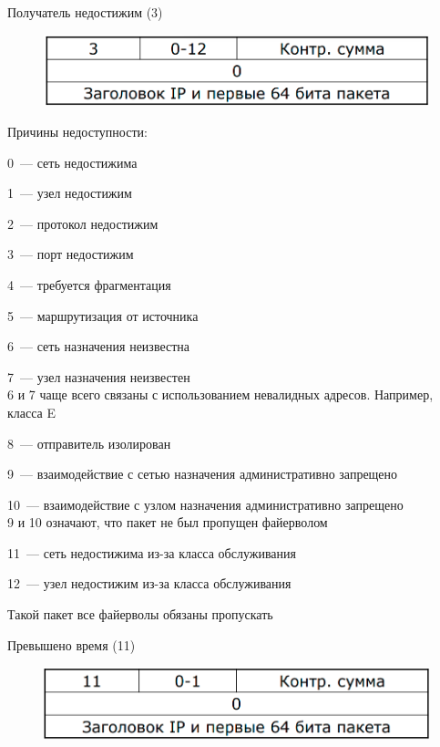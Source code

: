 
\begin{MyItemize}
    \item Получатель недостижим (3)\\
    \begin{figure}[H]
        \centering
        \includegraphics[width=15cm]{images/02/10}
        \end{figure}

    Причины недоступности:
    \begin{MyItemize}
        \item 0~--- сеть недостижима
        \item 1~--- узел недостижим
        \item 2~--- протокол недостижим
        \item 3~--- порт недостижим
        \item 4~--- требуется фрагментация
        \item 5~--- маршрутизация от источника
        \item 6~--- сеть назначения неизвестна
        \item 7~--- узел назначения неизвестен\\
        6 и 7 чаще всего связаны с использованием невалидных адресов. Например, класса E
        \item 8~--- отправитель изолирован
        \item 9~--- взаимодействие с сетью назначения административно запрещено
        \item 10~--- взаимодействие с узлом назначения административно запрещено\\
        9 и 10 означают, что пакет не был пропущен файерволом
        \item 11~--- сеть недостижима из-за класса обслуживания
        \item 12~--- узел недостижим из-за класса обслуживания
    \end{MyItemize}
    Такой пакет все файерволы обязаны пропускать
    \item Превышено время (11)\\
    \begin{figure}[H]
        \centering
        \includegraphics[width=15cm]{images/02/11}

\end{figure}
\end{MyItemize}

